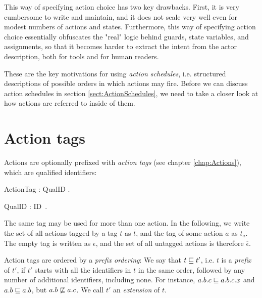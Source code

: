 This way of specifying action choice has two key drawbacks. First, it
is very cumbersome to write and maintain, and it does not scale very
well even for modest numbers of actions and
states.  Furthermore, this
way of specifying action choice essentially obfuscates the "real"
logic behind guards, state variables, and assignments, so that it
becomes harder to extract the intent from the actor description, both
for tools and for human readers. 

These are the key motivations for
using {\em action schedules}, i.e. structured descriptions of possible
orders in which actions may fire. Before we can discuss action
schedules in section \ref{sect:ActionSchedules}, we need to take a
closer look at how actions are referred to inside of them.


\section{Action tags}\label{sect:ActionNames}



Actions are optionally prefixed with {\em action tags} (see chapter
\ref{chap:Actions}), which are qualified identifiers:

\bgr
  ActionTag :  QualID .

  QualID : ID~.
\egr

The same tag may be used for more than one action. In the following,
we write the set of all actions tagged by a tag $t$ as $\overline t$,
and the tag of some action $a$ as $t_a$. The empty tag is written as
$\epsilon$, and the set of all untagged actions is therefore
$\overline\epsilon$.

Action tags are ordered by a {\em prefix ordering}: We say that $t
\sqsubseteq t'$, i.e. $t$ is a {\em prefix} of $t'$, if $t'$ starts with
all the identifiers in $t$ in the same order, followed by any number
of additional identifiers, including none. For instance, $a.b.c
\sqsubseteq a.b.c.x$ and $a.b \sqsubseteq a.b$, but $a.b \not \sqsubseteq
a.c$. We call $t'$ an {\em extension} of $t$.

